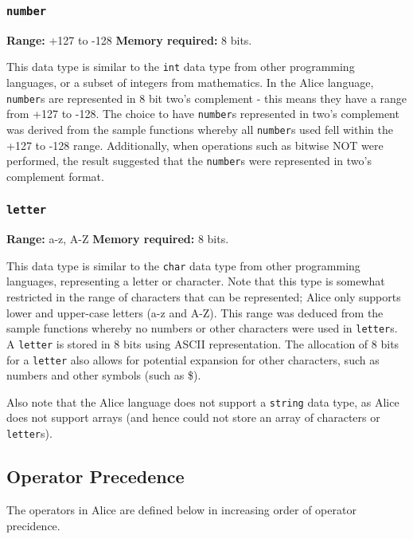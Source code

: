 \documentclass[a4wide, 10pt]{article}
\newcommand{\tab}{\hspace*{2em}}
\begin{document}
\subsubsection{\texttt{number}}
\label{sec:number}
{\bf Range:} +127 to -128 {\bf Memory required:} 8 bits.
 
\tab This data type is similar to the \texttt{int} data type from other 
programming languages, or a subset of integers from mathematics. In the Alice 
language, \texttt{number}s are represented in 8 bit two's complement - this
means they have a range from +127 to -128. The choice to have \texttt{number}s
represented in two's complement was derived from the sample functions whereby
all \texttt{number}s used fell within the +127 to -128 range. Additionally, when
operations such as bitwise NOT were performed, the result suggested that the 
\texttt{number}s were represented in two's complement format.

\subsubsection{\texttt{letter}}

{\bf Range:} a-z, A-Z {\bf Memory required:} 8 bits.

\tab This data type is similar to the \texttt{char} data type from other
programming languages, representing a letter or character. Note that this type
is somewhat restricted in the range of characters that can be represented; Alice
only supports lower and upper-case letters (a-z and A-Z). This range was deduced
from the sample functions whereby no numbers or other characters were used in
\texttt{letter}s. A \texttt{letter} is stored in 8 bits using ASCII 
representation. The allocation of 8 bits for a \texttt{letter} also allows for
potential expansion for other characters, such as numbers and other symbols 
(such as \$).

Also note that the Alice language does not support a \texttt{string} data 
type, as Alice does not support arrays (and hence could not store an array of
characters or \texttt{letter}s).

\subsection{Operator Precedence}
The operators in Alice are defined below in increasing order of operator precidence.
\end{document}
